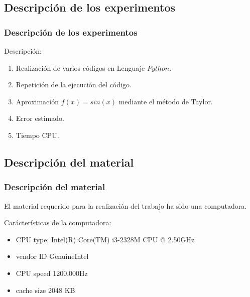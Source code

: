 \documentclass{beamer}
\begin{document}
\subsection{Descripción de los experimentos}
\begin{frame}
\frametitle{Descripción de los experimentos}
\begin{block}{Descripción:}
  \begin{enumerate}
    \item Realización de varios códigos en Lenguaje $Python$. \pause
    \item Repetición de la ejecución del código. \pause
    \item Aproximación $f(x) =sin(x)$ mediante el método de Taylor. \pause
    \item Error estimado. \pause
    \item Tiempo CPU. 
  \end{enumerate}
\end{block}
\end{frame}

\subsection{Descripción del material}

\begin{frame}
\frametitle{Descripción del material}


  El material requerido para la realización del trabajo ha sido una computadora.


\begin{block}{Carácterísticas de la computadora:}
  \begin{itemize}
    \item  CPU type: Intel(R) Core(TM) i3-2328M CPU @ 2.50GHz \pause
    \item  vendor ID	GenuineIntel\pause
    \item  CPU speed	1200.000Hz\pause
    \item <4->   cache size	2048 KB
  \end{itemize}
\end{block}

\end{frame}
\end{document}

